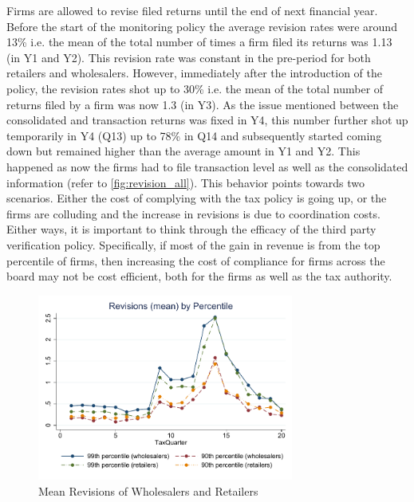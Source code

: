 Firms are allowed to revise filed returns until the end of next financial year. Before the start of the monitoring policy the average revision rates were around 13\% i.e. the mean of the total number of times a firm filed its returns was 1.13 (in Y1 and Y2). This revision rate was constant in the pre-period for both retailers and wholesalers. However, immediately after the introduction of the policy, the revision rates shot up to 30\% i.e. the mean of the total number of returns filed by a firm was now 1.3 (in Y3). As the issue mentioned between the consolidated and transaction returns was fixed in Y4, this number further shot up temporarily in Y4 (Q13) up to 78\% in Q14 and subsequently started coming down but remained higher than the average amount in Y1 and Y2.  This happened as now the firms had to file transaction level as well as the consolidated information (refer to \cref{fig:revision_all}). This behavior points towards two scenarios. Either the cost of complying with the tax policy is going up, or the firms are colluding and the increase in revisions is due to coordination costs. Either ways, it is important to think through the efficacy of the third party verification policy. Specifically, if most of the gain in revenue is from the top percentile of firms, then increasing the cost of compliance for firms across the board may not be cost efficient, both for the firms as well as the tax authority.

\begin{figure}[t!] 
\includegraphics[width=0.75\textwidth]{graphs/RevisionsWholesSalerVsRetailerTopPercentile.pdf}
\caption{Mean Revisions of Wholesalers and Retailers}
\label{fig:revision_topdecile}
\end{figure}

